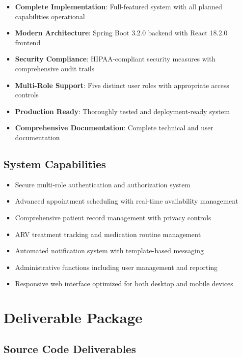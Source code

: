 \documentclass[12pt,a4paper]{article}
\begin{document}
\begin{itemize}
    \item \textbf{Complete Implementation}: Full-featured system with all planned capabilities operational
    \item \textbf{Modern Architecture}: Spring Boot 3.2.0 backend with React 18.2.0 frontend
    \item \textbf{Security Compliance}: HIPAA-compliant security measures with comprehensive audit trails
    \item \textbf{Multi-Role Support}: Five distinct user roles with appropriate access controls
    \item \textbf{Production Ready}: Thoroughly tested and deployment-ready system
    \item \textbf{Comprehensive Documentation}: Complete technical and user documentation
\end{itemize}

\subsection{System Capabilities}

\begin{itemize}
    \item Secure multi-role authentication and authorization system
    \item Advanced appointment scheduling with real-time availability management
    \item Comprehensive patient record management with privacy controls
    \item ARV treatment tracking and medication routine management
    \item Automated notification system with template-based messaging
    \item Administrative functions including user management and reporting
    \item Responsive web interface optimized for both desktop and mobile devices
\end{itemize}

\section{Deliverable Package}

\subsection{Source Code Deliverables}
\end{document}
